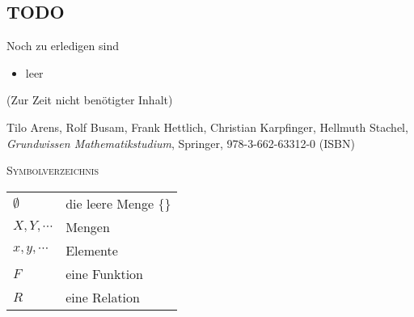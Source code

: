 \documentclass[a4paper]{amsart}
\theoremstyle{definition}
\begin{document}
\begin{backup}
\section{TODO}
Noch zu erledigen sind
\begin{itemize}
   \item leer
\end{itemize}
\end{backup}

\begin{backup}
    (Zur Zeit nicht benötigter Inhalt)
\end{backup}

\begin{thebibliography}{9}

      Tilo Arens, Rolf Busam, Frank Hettlich, Christian Karpfinger, Hellmuth Stachel, \emph{Grundwissen Mathematikstudium},
      Springer, 978-3-662-63312-0 (ISBN)

\end{thebibliography}

\begin{large}
    \centerline{\textsc{Symbolverzeichnis}}
\end{large}
\bigskip

\renewcommand*{\arraystretch}{1}

\begin{tabular}{ll}
    $\emptyset$             & die leere Menge $\{\}$\\
    $X, Y, \cdots$          & Mengen\\
    $x, y, \cdots$             & Elemente\\
    $F$                 & eine Funktion\\
    $R$             & eine Relation

\end{tabular}
\end{document}
